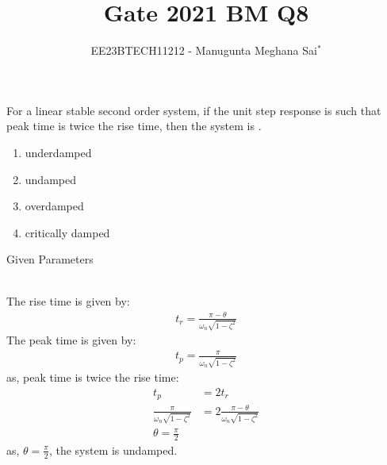 \documentclass[journal,12pt,onecolumn]{IEEEtran}
\theoremstyle{remark}
\begin{document}
    
    
    \vspace{3cm}
    
    \title{Gate 2021 BM Q8}
    \author{EE23BTECH11212 - Manugunta Meghana Sai$^{*}$%
    }
    \maketitle
    \bigskip
    
    \renewcommand{\thefigure}{\theenumi}
    \renewcommand{\thetable}{\theenumi}
    
    \vspace{3cm}
    
    For a linear stable second order system, if the unit step response is such that peak time is twice the rise time, then the system is . 
    \begin{enumerate}
    \item underdamped\\
    \item undamped\\
    \item overdamped\\
    \item critically damped\\
    \end{enumerate}
    \solution
    \begin{table}[h!]
 	\centering
 	\resizebox{6 cm}{!}{
 		
 	}
 	\caption{Given Parameters}
 	\label{tab:msmBMgate8tab1}
     \end{table} 
    \\The rise time is given by:
    \begin{align}
    t_{r} = \frac{\pi-\theta}{\omega_{n} \sqrt{1-\zeta^{2}}}
    \end{align}
    The peak time is given by:
    \begin{align}
    t_{p} = \frac{\pi}{\omega_{n} \sqrt{1-\zeta^{2}}}
    \end{align}
    as, peak time is twice the rise time:
    \begin{align}
    t_{p} &= 2t_{r}\\
    \frac{\pi}{\omega_{n} \sqrt{1-\zeta^{2}}} &= 2\frac{\pi-\theta}{\omega_{n} \sqrt{1-\zeta^{2}}}\\
    \theta = \frac{\pi}{2}
    \end{align}
    as, $\theta = \frac{\pi}{2}$, the system is undamped.
\end{document}
